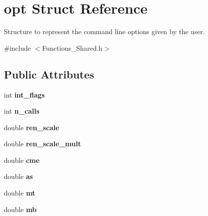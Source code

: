 \hypertarget{structopt}{}\section{opt Struct Reference}
\label{structopt}


Structure to represent the command line options given by the user.  




{\ttfamily \#include $<$Functions\+\_\+\+Shared.\+h$>$}

\subsection*{Public Attributes}
\begin{DoxyCompactItemize}
\item 
\hypertarget{structopt_acc52d812132128f6088537b4e7e07be6}{}int {\bfseries int\+\_\+flags}\label{structopt_acc52d812132128f6088537b4e7e07be6}

\item 
\hypertarget{structopt_a6ddc969cea0f437ecea3bb299d14f69d}{}int {\bfseries n\+\_\+calls}\label{structopt_a6ddc969cea0f437ecea3bb299d14f69d}

\item 
\hypertarget{structopt_a076fcc87cf2c8ce62c9504c304015d45}{}double {\bfseries ren\+\_\+scale}\label{structopt_a076fcc87cf2c8ce62c9504c304015d45}

\item 
\hypertarget{structopt_ab7334c1859add22b3f27dfb7ab930a0d}{}double {\bfseries ren\+\_\+scale\+\_\+mult}\label{structopt_ab7334c1859add22b3f27dfb7ab930a0d}

\item 
\hypertarget{structopt_a8f98480b8d9fd189e551b50bf7b0e87d}{}double {\bfseries cme}\label{structopt_a8f98480b8d9fd189e551b50bf7b0e87d}

\item 
\hypertarget{structopt_ab61a87d5704d0c5ffde1ecdf99c58ec5}{}double {\bfseries as}\label{structopt_ab61a87d5704d0c5ffde1ecdf99c58ec5}

\item 
\hypertarget{structopt_a17c18467f0aef580d814ffa6b0836ab7}{}double {\bfseries mt}\label{structopt_a17c18467f0aef580d814ffa6b0836ab7}

\item 
\hypertarget{structopt_aafc6d245f706da1a6e3d28c01a48df40}{}double {\bfseries mb}\label{structopt_aafc6d245f706da1a6e3d28c01a48df40}


\end{DoxyCompactItemize}
